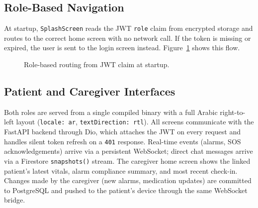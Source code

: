 \documentclass[12pt,a4paper]{report}
\begin{document}
\subsection{Role-Based Navigation}

At startup, \texttt{SplashScreen} reads the JWT \texttt{role} claim from encrypted storage and routes to the correct home screen with no network call. If the token is missing or expired, the user is sent to the login screen instead. Figure~\ref{fig:routing} shows this flow.

\begin{figure}[H]
\centering
{}
\caption{Role-based routing from JWT claim at startup.}
\label{fig:routing}
\end{figure}

\subsection{Patient and Caregiver Interfaces}

Both roles are served from a single compiled binary with a full Arabic right-to-left layout (\texttt{locale: ar}, \texttt{textDirection: rtl}). All screens communicate with the FastAPI backend through Dio, which attaches the JWT on every request and handles silent token refresh on a \texttt{401} response. Real-time events (alarms, SOS acknowledgements) arrive via a persistent WebSocket; direct chat messages arrive via a Firestore \texttt{snapshots()} stream. The caregiver home screen shows the linked patient's latest vitals, alarm compliance summary, and most recent check-in. Changes made by the caregiver (new alarms, medication updates) are committed to PostgreSQL and pushed to the patient's device through the same WebSocket bridge.
\end{document}
